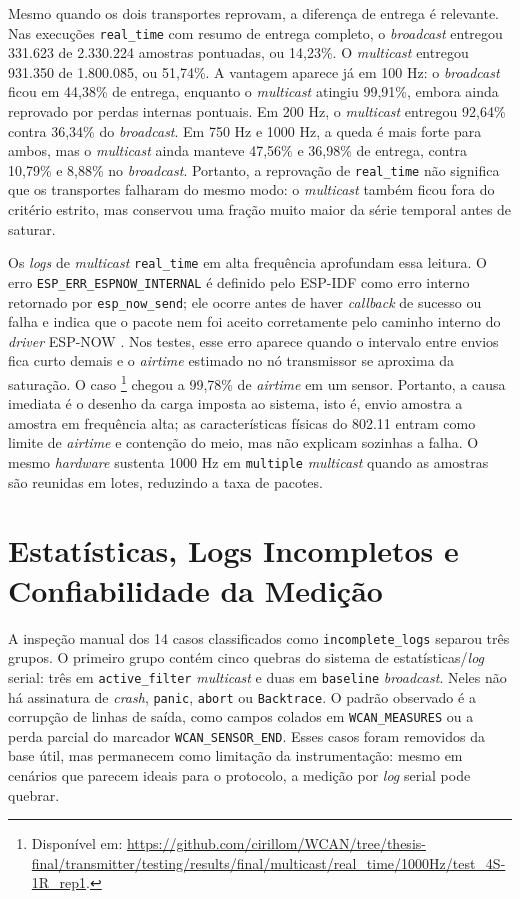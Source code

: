 Mesmo quando os dois transportes reprovam, a diferença de entrega é relevante.
Nas execuções \texttt{real\_time} com resumo de entrega completo, o \emph{broadcast}
entregou 331.623 de 2.330.224 amostras pontuadas, ou 14,23\%. O \emph{multicast}
entregou 931.350 de 1.800.085, ou 51,74\%. A vantagem aparece já em 100 Hz:
o \emph{broadcast} ficou em 44,38\% de entrega, enquanto o \emph{multicast} atingiu
99,91\%, embora ainda reprovado por perdas internas pontuais. Em 200 Hz, o
\emph{multicast} entregou 92,64\% contra 36,34\% do \emph{broadcast}. Em 750 Hz e 1000 Hz, a
queda é mais forte para ambos, mas o \emph{multicast} ainda manteve 47,56\% e 36,98\%
de entrega, contra 10,79\% e 8,88\% no \emph{broadcast}. Portanto, a reprovação de
\texttt{real\_time} não significa que os transportes falharam do mesmo modo: o
\emph{multicast} também ficou fora do critério estrito, mas conservou uma fração muito
maior da série temporal antes de saturar.

Os \emph{logs} de \emph{multicast} \texttt{real\_time} em alta frequência aprofundam essa
leitura. O erro \texttt{ESP\_ERR\_ESPNOW\_INTERNAL} é definido pelo ESP-IDF como
erro interno retornado por \texttt{esp\_now\_send}; ele ocorre antes de haver
\emph{callback} de sucesso ou falha e indica que o pacote nem foi aceito corretamente
pelo caminho interno do \emph{driver} ESP-NOW \cite{espressif_espnow_programming_guide}.
Nos testes, esse erro aparece quando o intervalo entre envios fica curto demais e
o \emph{airtime} estimado no nó transmissor se aproxima da saturação. O caso
\footnote{Disponível em: \url{https://github.com/cirillom/WCAN/tree/thesis-final/transmitter/testing/results/final/multicast/real_time/1000Hz/test_4S-1R_rep1}.} chegou a 99,78\% de \emph{airtime} em
um sensor. Portanto, a causa imediata é o desenho da carga imposta ao sistema,
isto é, envio amostra a amostra em frequência alta; as características físicas do
802.11 entram como limite de \emph{airtime} e contenção do meio, mas não explicam
sozinhas a falha. O mesmo \emph{hardware} sustenta 1000 Hz em \texttt{multiple}
\emph{multicast} quando as amostras são reunidas em lotes, reduzindo a taxa de pacotes.

\section{Estatísticas, Logs Incompletos e Confiabilidade da Medição}

A inspeção manual dos 14 casos classificados como \texttt{incomplete\_logs}
separou três grupos. O primeiro grupo contém cinco quebras do sistema de
estatísticas/\emph{log} serial: três em \texttt{active\_filter} \emph{multicast} e duas em
\texttt{baseline} \emph{broadcast}. Neles não há assinatura de \emph{crash}, \texttt{panic},
\texttt{abort} ou \texttt{Backtrace}. O padrão observado é a corrupção de linhas
de saída, como campos colados em \texttt{WCAN\_MEASURES} ou a perda parcial do
marcador \texttt{WCAN\_SENSOR\_END}. Esses casos foram removidos da base útil,
mas permanecem como limitação da instrumentação: mesmo em cenários que parecem
ideais para o protocolo, a medição por \emph{log} serial pode quebrar.

